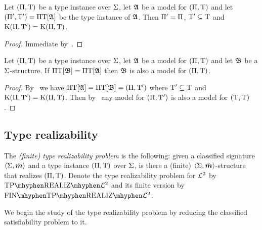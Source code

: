 \begin{remark}\label{rem:tpi-str-ex}
Let $(\Pi,\mathrm{T})$ be a type instance over $\mathrm{\Sigma}$, 
let $\mathfrak{A}$ be a model for $(\Pi,\mathrm{T})$
and let $({\Pi'},{\mathrm{T}'}) =\Pi\mathrm{T}[\mathfrak{A}]$ be the type instance of $\mathfrak{A}$.
Then ${\Pi'} = \Pi$, ${\mathrm{T}'} \subseteq \mathrm{T}$ and $\mathrm{K}(\Pi,{\mathrm{T}'}) =
\mathrm{K}(\Pi,\mathrm{T})$.
\end{remark}
\begin{proof}
Immediate by~.
\end{proof}
\begin{remark}\label{rem:tpi-str-inv}
Let $(\Pi,\mathrm{T})$ be a type instance over $\mathrm{\Sigma}$,
let $\mathfrak{A}$ be a model for $(\Pi,\mathrm{T})$
and let $\mathfrak{B}$ be a $\mathrm{\Sigma}$-structure.
If $\Pi\mathrm{T}[\mathfrak{B}] = \Pi\mathrm{T}[\mathfrak{A}]$ then $\mathfrak{B}$ is also a model for
$(\Pi,\mathrm{T})$.
\end{remark}
\begin{proof}
By~ we have $\Pi\mathrm{T}[\mathfrak{A}] = \Pi\mathrm{T}[\mathfrak{B}] =
(\Pi,{\mathrm{T}'})$ where ${\mathrm{T}'} \subseteq \mathrm{T}$ and $\mathrm{K}(\Pi,{\mathrm{T}'}) =
\mathrm{K}(\Pi,\mathrm{T})$. Then by~ any model for $(\Pi,{\mathrm{T}'})$
is also a model for $(\mathrm{T},\mathrm{T})$.
\end{proof}
\subsection{Type realizability}
\begin{definition}
The \emph{(finite) type realizability problem} is the following:
given a classified signature $\left\langle \mathrm{\Sigma},\bar{\bm{m}} \right\rangle$ and a type instance
$(\Pi,\mathrm{T})$ over $\mathrm{\Sigma}$, is there a (finite)
$\left\langle \mathrm{\Sigma},\bar{\bm{m}} \right\rangle$-structure that realizes $(\Pi,\mathrm{T})$.
Denote the type realizability problem for $\mathcal{L}^{2}$ by
$\Real{\vFo2}$ and its finite version by $\FinReal{\vFo2}$.
\end{definition}

We begin the study of the type realizability problem by reducing the
classified satisfiability problem to it.

